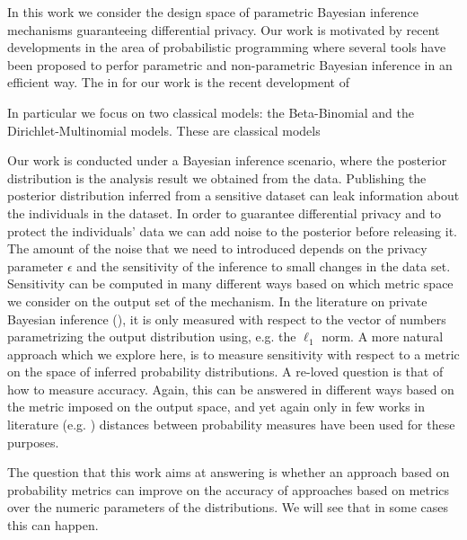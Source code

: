 \documentclass{article}
\begin{document}
In this work we consider the design space of  parametric Bayesian
inference mechanisms guaranteeing differential privacy. Our work is
motivated by recent developments in the area of probabilistic
programming where several tools have been proposed to perfor
parametric and non-parametric Bayesian inference in an efficient
way. The in
for our work is the recent development of 

In particular
we focus on two classical models: the Beta-Binomial and the
Dirichlet-Multinomial models. These are classical models 


Our work is conducted under a Bayesian inference scenario, where the posterior distribution is the analysis result we obtained from the data.
Publishing the posterior distribution inferred from a sensitive dataset can
leak information about the individuals in the dataset.
In order to guarantee differential privacy and to protect the
individuals' data we can add noise to the posterior before releasing it.
The amount of the noise that we need to introduced
depends on the privacy parameter $\epsilon$ and the sensitivity of the inference to
small changes in the data set. 
Sensitivity can be computed in many different ways based on which metric space
we consider on the output set of the mechanism. In the literature on private Bayesian
inference (\cite{zhang2016differential,xiao2012bayesian}), it is only measured with
respect to the vector of numbers parametrizing the output distribution using, e.g. the $\ell_1$ norm.
A more natural approach which we explore here, is to measure sensitivity with respect to a metric on the space of inferred probability distributions.
A re-loved question is that of how to measure accuracy. Again,
this can be answered in different ways based on the metric imposed on the output space, and yet again
only in few works in literature (e.g. \cite{zhang2016differential})
distances between probability measures have been used for these purposes.


The question that this work aims at answering is whether
an approach based on probability metrics can improve on
the accuracy of approaches based on metrics over
the numeric parameters of the distributions. 
We will see that in some cases this can happen.
\end{document}
